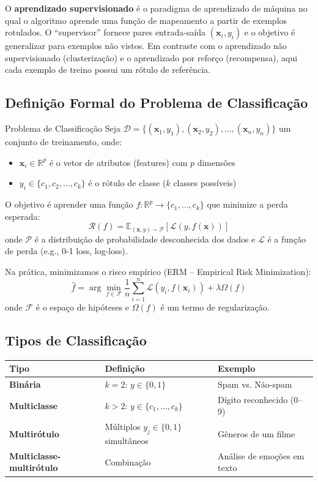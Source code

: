 \documentclass[12pt,a4paper]{article}
\begin{document}
O \textbf{aprendizado supervisionado} é o paradigma de aprendizado de máquina no qual o algoritmo aprende uma função de mapeamento a partir de exemplos rotulados. O ``supervisor'' fornece pares entrada-saída $(\mathbf{x}_i, y_i)$ e o objetivo é generalizar para exemplos não vistos. Em contraste com o aprendizado não supervisionado (clusterização) e o aprendizado por reforço (recompensa), aqui cada exemplo de treino possui um rótulo de referência.

\subsection{Definição Formal do Problema de Classificação}

\begin{definicaobox}{Problema de Classificação}
Seja $\mathcal{D} = \{(\mathbf{x}_1, y_1), (\mathbf{x}_2, y_2), \ldots, (\mathbf{x}_n, y_n)\}$ um conjunto de treinamento, onde:
\begin{itemize}
  \item $\mathbf{x}_i \in \mathbb{R}^p$ é o vetor de atributos (features) com $p$ dimensões
  \item $y_i \in \{c_1, c_2, \ldots, c_k\}$ é o rótulo de classe ($k$ classes possíveis)
\end{itemize}
O objetivo é aprender uma função $f: \mathbb{R}^p \rightarrow \{c_1, \ldots, c_k\}$ que minimize a perda esperada:
\[
  \mathcal{R}(f) = \mathbb{E}_{(\mathbf{x},y) \sim \mathcal{P}}[\mathcal{L}(y, f(\mathbf{x}))]
\]
onde $\mathcal{P}$ é a distribuição de probabilidade desconhecida dos dados e $\mathcal{L}$ é a função de perda (e.g., 0-1 loss, log-loss).
\end{definicaobox}

Na prática, minimizamos o risco empírico (ERM -- Empirical Risk Minimization):
\[
  \hat{f} = \arg\min_{f \in \mathcal{F}} \frac{1}{n} \sum_{i=1}^{n} \mathcal{L}(y_i, f(\mathbf{x}_i)) + \lambda \Omega(f)
\]
onde $\mathcal{F}$ é o espaço de hipóteses e $\Omega(f)$ é um termo de regularização.

\subsection{Tipos de Classificação}

\begin{tabular}{>{\bfseries}p{3.5cm}p{5cm}p{5cm}}
\toprule
Tipo & Definição & Exemplo \\
\midrule
Binária & $k = 2$: $y \in \{0, 1\}$ & Spam vs. Não-spam \\
Multiclasse & $k > 2$: $y \in \{c_1,\ldots,c_k\}$ & Dígito reconhecido (0--9) \\
Multirótulo & Múltiplos $y_j \in \{0,1\}$ simultâneos & Gêneros de um filme \\
Multiclasse-multirótulo & Combinação & Análise de emoções em texto \\
\bottomrule
\end{tabular}
\end{document}
